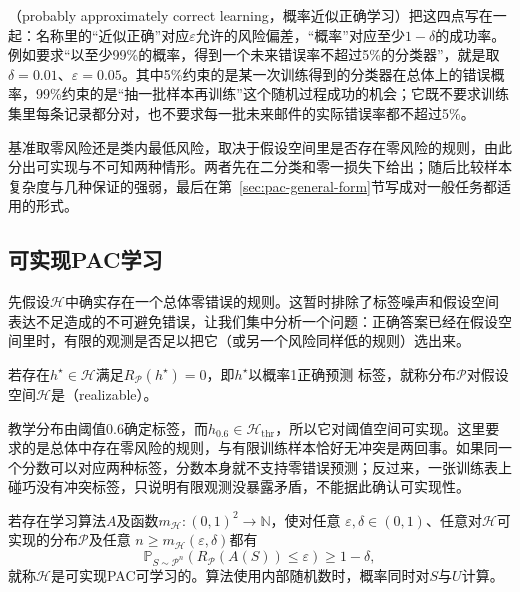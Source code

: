 （probably approximately correct learning，概率近似正确学习）把这四点写在一起：名称里的“近似正确”对应$\varepsilon$允许的风险偏差，“概率”对应至少$1-\delta$的成功率。例如要求“以至少99\%的概率，得到一个未来错误率不超过5\%的分类器”，就是取$\delta=0.01$、$\varepsilon=0.05$。其中5\%约束的是某一次训练得到的分类器在总体上的错误概率，99\%约束的是“抽一批样本再训练”这个随机过程成功的机会；它既不要求训练集里每条记录都分对，也不要求每一批未来邮件的实际错误率都不超过5\%。

基准取零风险还是类内最低风险，取决于假设空间里是否存在零风险的规则，由此分出可实现与不可知两种情形。两者先在二分类和零一损失下给出；随后比较样本复杂度与几种保证的强弱，最后在第~\ref{sec:pac-general-form}节写成对一般任务都适用的形式。

\subsection{可实现PAC学习}
\label{sec:pac-realizable}

先假设$\mathcal H$中确实存在一个总体零错误的规则。这暂时排除了标签噪声和假设空间表达不足造成的不可避免错误，让我们集中分析一个问题：正确答案已经在假设空间里时，有限的观测是否足以把它（或另一个风险同样低的规则）选出来。

\begin{definition}[可实现性]
\label{def:realizability}
若存在$h^\star\in\mathcal H$满足$R_{\mathcal P}(h^\star)=0$，即$h^\star$以概率1正确预测
标签，就称分布$\mathcal P$对假设空间$\mathcal H$是（realizable）。
\end{definition}

教学分布由阈值0.6确定标签，而$h_{0.6}\in\mathcal H_{\mathrm{thr}}$，所以它对阈值空间可实现。这里要求的是总体中存在零风险的规则，与有限训练样本恰好无冲突是两回事。如果同一个分数可以对应两种标签，分数本身就不支持零错误预测；反过来，一张训练表上碰巧没有冲突标签，只说明有限观测没暴露矛盾，不能据此确认可实现性。

\begin{definition}[可实现PAC可学习]
\label{def:realizable-pac}
若存在学习算法$A$及函数$m_{\mathcal H}:(0,1)^2\to\mathbb N$，使对任意
$\varepsilon,\delta\in(0,1)$、任意对$\mathcal H$可实现的分布$\mathcal P$及任意
$n\geq m_{\mathcal H}(\varepsilon,\delta)$都有
\begin{equation}
 \mathbb P_{S\sim\mathcal P^n}
 \left(R_{\mathcal P}(A(S))\leq\varepsilon\right)\geq1-\delta,
 \label{eq:pac-guarantee}
\end{equation}
就称$\mathcal H$是可实现PAC可学习的。算法使用内部随机数时，概率同时对$S$与$U$计算。
\end{definition}


